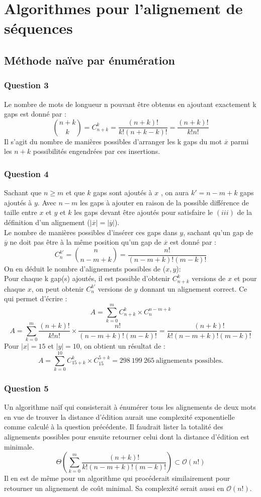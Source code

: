 \documentclass[12pt, a4paper]{report}
\begin{document}
\section{Algorithmes pour l'alignement de séquences }
\subsection{Méthode naïve par énumération}


\subsubsection{Question 3}
Le nombre de mots de longueur n pouvant être obtenus en ajoutant exactement k gaps est donné par :
$$\binom{n+k}{k}=C_{n+k}^{k}=\frac{(n+k)!}{k!(n+k-k)!}=\frac{(n+k)!}{k! n!}$$
Il s'agit du nombre de manières possibles d'arranger les k gaps du mot $\overline{x}$ parmi les $n+k$ possibilités engendrées par ces insertions. 


\subsubsection{Question 4}
Sachant que $n \geq m$ et que $k$ gaps sont ajoutés à $x$ , on aura $k'=n-m+k$ gaps ajoutés à $y$. Avec $n-m$ les gaps à ajouter en raison de la possible différence de taille entre $x$ et $y$ et $k$ les gaps devant être ajoutés pour satisfaire le $(iii)$ de la définition d'un alignement ($|\overline{x}|=|\overline{y}|$).\\
Le nombre de manières possibles d'insérer ces gaps dans $y$, sachant qu'un gap de $\overline{y}$ ne doit pas être à la même position qu'un gap de $\overline{x}$ est donné par :
$$C_{n}^{k'}=\binom{n}{n-m+k}=\frac{n!}{(n-m+k)!(m-k)!}$$
On en déduit le nombre d'alignements possibles de ($x,y$):\\
Pour chaque k gap(s) ajoutés, il est possible d'obtenir $C_{n+k}^{k}$ versions de $x$ et pour chaque $x$, on peut obtenir $C_{n}^{k'}$  versions de $y$ donnant un alignement correct. Ce qui permet d'écrire :
$$A=\sum_{k=0}^{m}C_{n+k}^{k} \times C_{n}^{n-m+k}$$
$$A=\sum_{k=0}^{m}\frac{(n+k)!}{k! n!} \times \frac{n!}{(n-m+k)!(m-k)!}=\frac{(n+k)!}{k!(n-m+k)!(m-k)!}$$
Pour $|x|=15$ et $|y|=10$, on obtient un résultat de : 
$$A=\sum_{k=0}^{10}C_{15+k}^{k} \times C_{15}^{5+k}=298\ 199\ 265\  \text{alignements possibles.}$$

\subsubsection{Question 5}
Un algorithme naïf qui consisterait à énumérer tous les alignements de deux mots en vue de trouver la distance d'édition aurait une complexité exponentielle comme calculé à la question précédente. Il faudrait lister la totalité des alignements possibles pour ensuite retourner celui dont la distance d'édition est minimale.\\
$$\Theta (\sum_{k=0}^{m}\frac{(n+k)!}{k!(n-m+k)!(m-k)!}) \subset \mathcal{O}(n!)$$
Il en est de même pour un algorithme qui procéderait similairement pour retourner un alignement de coût minimal. Sa complexité serait aussi en $\mathcal{O}(n!)$.
\end{document}

